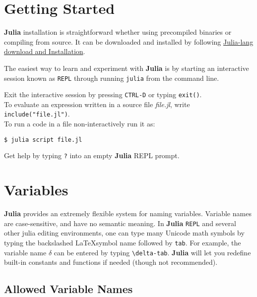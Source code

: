 \documentclass[
]{article}
\begin{document}
\hypertarget{getting-started}{%
\section{Getting Started}\label{getting-started}}

\textbf{Julia} installation is straightforward whether using precompiled
binaries or compiling from source. It can be downloaded and installed by
following \href{https://julialang.org/downloads/}{Julia-lang download
and Installation}.

The easiest way to learn and experiment with \textbf{Julia} is by
starting an interactive session known as \texttt{REPL} through running
\texttt{julia} from the command line.

Exit the interactive session by pressing \texttt{CTRL-D} or typing
\texttt{exit()}.\\
To evaluate an expression written in a source file \emph{file.jl}, write
\texttt{include("file.jl")}.\\
To run a code in a file non-interactively run it as:

\begin{verbatim}
$ julia script file.jl
\end{verbatim}

Get help by typing \texttt{?} into an empty \textbf{Julia} REPL prompt.

\newpage

\hypertarget{variables}{%
\section{Variables}\label{variables}}

\textbf{Julia} provides an extremely flexible system for naming
variables. Variable names are case-sensitive, and have no semantic
meaning. In \textbf{Julia} \texttt{REPL} and several other julia editing
environments, one can type many Unicode math symbols by typing the
backslashed \LaTeX symbol name followed by \texttt{tab}. For example,
the variable name \(\delta\) can be entered by typing
\texttt{\textbackslash{}delta-tab}. \textbf{Julia} will let you redefine
built-in constants and functions if needed (though not recommended).

\hypertarget{allowed-variable-names}{%
\subsection{Allowed Variable Names}\label{allowed-variable-names}}
\end{document}
